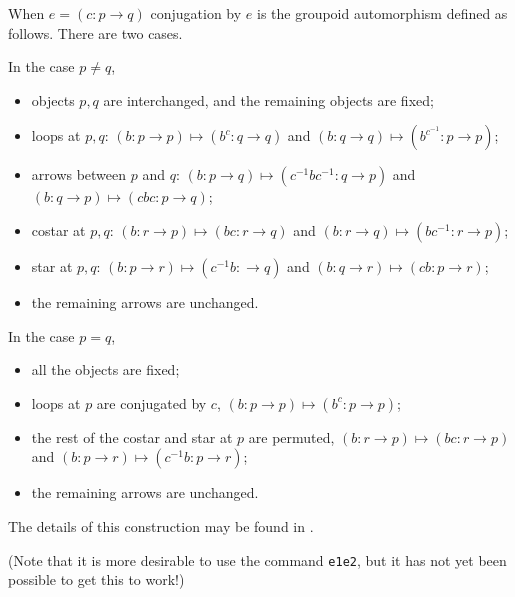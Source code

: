 \documentclass[a4paper,11pt]{report}
\begin{document}
{{{ When $e = (c : p \to q)$ conjugation by $e$ is the groupoid automorphism defined as follows. There are two cases. 

 In the case $p \neq q$, 
\begin{itemize}
\item  objects $p,q$ are interchanged, and the remaining objects are fixed; 
\item  loops at $p,q$: $(b: p \to p) \mapsto (b^c : q \to q)$ and $(b: q \to q) \mapsto (b^{c^{-1}} : p \to p)$; 
\item  arrows between $p$ and $q$: $(b : p \to q) \mapsto (c^{-1}bc^{-1} : q \to p)$ and $(b : q \to p) \mapsto (cbc : p \to q)$; 
\item  costar at $p,q$: $(b : r \to p) \mapsto (bc : r \to q)$ and $(b : r \to q) \mapsto (bc^{-1} : r \to p)$; 
\item  star at $p,q$: $(b : p \to r) \mapsto (c^{-1}b : \to q)$ and $(b : q \to r) \mapsto (cb : p \to r)$; 
\item  the remaining arrows are unchanged. 
\end{itemize}
 

 In the case $p=q$, 
\begin{itemize}
\item  all the objects are fixed; 
\item  loops at $p$ are conjugated by $c$, $(b : p \to p) \mapsto (b^c : p \to p)$; 
\item  the rest of the costar and star at $p$ are permuted, $(b : r \to p) \mapsto (bc : r \to p)$ and $(b : p \to r) \mapsto (c^{-1}b : p \to r)$; 
\item  the remaining arrows are unchanged. 
\end{itemize}
 

 The details of this construction may be found in \cite{AlWe}. 

 (Note that it is more desirable to use the command \texttt{e1\texttt{}e2}, but it has not yet been possible to get this to work!) }

\begin{Verbatim}[commandchars=!@|,fontsize=\small,frame=single,label=Example]
  

\end{Verbatim}}}
\end{document}
